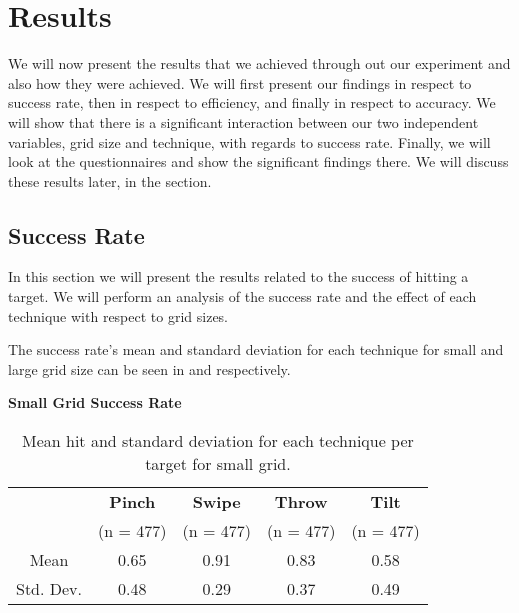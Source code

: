 \section{Results}
We will now present the results that we achieved through out our experiment and also how they were achieved. We will first present our findings in respect to success rate, then in respect to efficiency, and finally in respect to accuracy. We will show that there is a significant interaction between our two independent variables, grid size and technique, with regards to success rate. Finally, we will look at the questionnaires and show the significant findings there. We will discuss these results later, in the  section.  

\subsection{Success Rate}
In this section we will present the results related to the success of hitting a target.
We will perform an analysis of the success rate and the effect of each technique with respect to grid sizes.

The success rate's mean and standard deviation for each technique for small and large grid size can be seen in  and  respectively.

\begin{table}[H]
	\centering
	\textbf{Small Grid Success Rate}\\[4pt]
	\begin{tabular}{|c|c|c|c|c|}
			\hline
			\rowcolor[HTML]{9B9B9B} 
			& \textbf{Pinch} & \textbf{Swipe} & \textbf{Throw} & \textbf{Tilt} \\
			\rowcolor[HTML]{9B9B9B} 
			 & (n = 477) & (n = 477) & (n = 477) & (n = 477) \\ \hline
			Mean & 0.65         & 0.91          & 0.83          & 0.58         \\ \hline
			Std. Dev. & 0.48 & 0.29 & 0.37 & 0.49 \\ \hline
	\end{tabular}
	\caption{Mean hit  and standard deviation for each technique per target for small grid.}
	\label{tab:meanHitTechniqueSmall}
\end{table}

